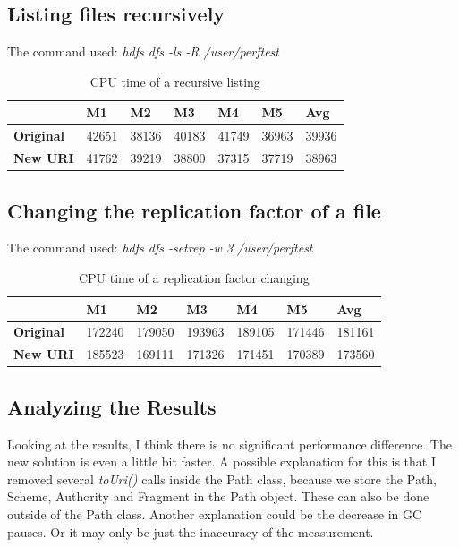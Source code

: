 \subsection{Listing files recursively}
The command used:  \textit{hdfs dfs -ls -R /user/perftest}

\begin{table}[H]
	\begin{tabular}{|l|l|l|l|l|l|l|}
		\hline
		& \textbf{M1} & \textbf{M2} & \textbf{M3} & \textbf{M4} & \textbf{M5} & \textbf{Avg} \\ \hline
		\textbf{Original} & 42651    & 38136    & 40183    & 41749    & 36963    & 39936     \\ \hline
		\textbf{New URI}  & 41762    & 39219    & 38800    & 37315    & 37719    & 38963     \\ \hline
	\end{tabular}
\centering
\caption{CPU time of a recursive listing}
\end{table}
\subsection{Changing the replication factor of a file}
The command used:  \textit{hdfs dfs -setrep -w 3 /user/perftest}

\begin{table}[H]
	\begin{tabular}{|l|l|l|l|l|l|l|}
		\hline
		& \textbf{M1} & \textbf{M2} & \textbf{M3} & \textbf{M4} & \textbf{M5} & \textbf{Avg} \\ \hline
		\textbf{Original} & 172240      & 179050      & 193963      & 189105      & 171446      & 181161       \\ \hline
		\textbf{New URI}  & 185523      & 169111      & 171326      & 171451      & 170389      & 173560       \\ \hline
	\end{tabular}
\centering
\caption{CPU time of a replication factor changing}
\end{table}

\subsection{Analyzing the Results}
Looking at the results, I think there is no significant performance difference. The new solution is even a little bit faster. A possible explanation for this is that I removed several \textit{toUri()} calls inside the Path class, because we store the Path, Scheme, Authority and Fragment in the Path object. These can also be done outside of the Path class. Another explanation could be the decrease in GC pauses. Or it may only be just the inaccuracy of the measurement.

